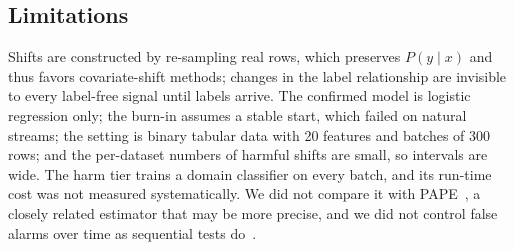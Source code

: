 \subsection{Limitations}
Shifts are constructed by re-sampling real rows, which preserves $P(y\mid x)$ and thus favors covariate-shift methods; changes in the label relationship are invisible to every label-free signal until labels arrive. The confirmed model is logistic regression only; the burn-in assumes a stable start, which failed on natural streams; the setting is binary tabular data with 20 features and batches of 300 rows; and the per-dataset numbers of harmful shifts are small, so intervals are wide. The harm tier trains a domain classifier on every batch, and its run-time cost was not measured systematically. We did not compare it with PAPE~\cite{bialek2025pape}, a closely related estimator that may be more precise, and we did not control false alarms over time as sequential tests do~\cite{podkopaev2022tracking}.
